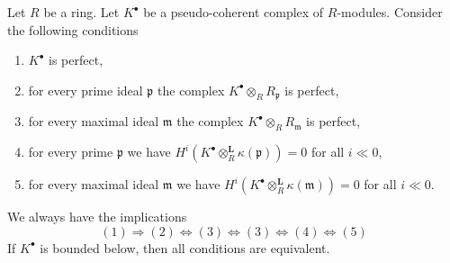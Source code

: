 \begin{lemma}
\label{lemma-check-perfect-stalks}
Let $R$ be a ring. Let $K^\bullet$ be a pseudo-coherent
complex of $R$-modules. Consider the following conditions
\begin{enumerate}
\item $K^\bullet$ is perfect,
\item for every prime ideal $\mathfrak p$ the complex
$K^\bullet \otimes_R R_{\mathfrak p}$ is perfect,
\item for every maximal ideal $\mathfrak m$ the complex
$K^\bullet \otimes_R R_{\mathfrak m}$ is perfect,
\item for every prime $\mathfrak p$ we have
$H^i(K^\bullet \otimes_R^{\mathbf{L}} \kappa(\mathfrak p)) = 0$ for all
$i \ll 0$,
\item for every maximal ideal $\mathfrak m$ we have
$H^i(K^\bullet \otimes_R^{\mathbf{L}} \kappa(\mathfrak m)) = 0$ for all
$i \ll 0$.
\end{enumerate}
We always have the implications
$$
(1) \Rightarrow (2) \Leftrightarrow (3) \Leftrightarrow (3)
\Leftrightarrow (4) \Leftrightarrow (5)
$$
If $K^\bullet$ is bounded below, then all conditions are equivalent.
\end{lemma}

